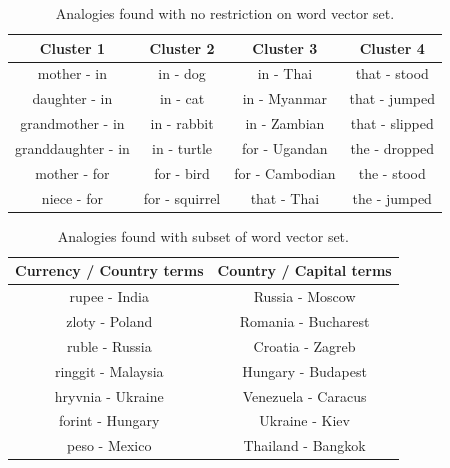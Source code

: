 \begin{table}[h]
	\caption{Analogies found with no restriction on word vector set.}
	\label{tab:analogies1}
	\centering
    \begin{tabular}{| c | c | c | c |}
    \hline
    \textbf{Cluster 1} & \textbf{Cluster 2} & \textbf{Cluster 3} & \textbf{Cluster 4}\\ \hline
    mother - in & in - dog & in - Thai & that - stood \\
    \hline
    daughter - in & in - cat & in - Myanmar & that - jumped\\
    \hline
    grandmother - in & in -  rabbit & in - Zambian & that - slipped\\
    \hline
    granddaughter - in & in - turtle & for - Ugandan & the - dropped \\
    \hline
    mother - for & for  - bird & for - Cambodian & the - stood \\
    \hline
    niece - for & for - squirrel & that - Thai & the - jumped\\
    \hline
    \end{tabular}
\end{table}


\begin{table}[h]
	\caption{Analogies found with subset of word vector set.}
	\label{tab:analogies2}
	\centering
    \begin{tabular}{| c | c |}
    \hline
    \textbf{Currency / Country terms} & \textbf{Country / Capital terms} \\ \hline
    rupee - India & Russia - Moscow\\
   \hline
    zloty - Poland & Romania - Bucharest \\
   \hline
    ruble - Russia & Croatia - Zagreb\\
   \hline
    ringgit - Malaysia & Hungary - Budapest\\
   \hline
    hryvnia - Ukraine & Venezuela - Caracus\\
   \hline forint - Hungary & Ukraine - Kiev\\
    peso - Mexico & Thailand - Bangkok\\
    \hline
    \end{tabular}
\end{table}

